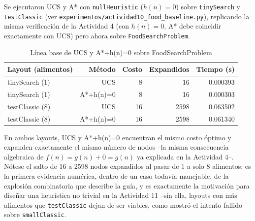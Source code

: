 Se ejecutaron UCS y A* con \texttt{nullHeuristic} ($h(n)=0$) sobre \texttt{tinySearch} y
\texttt{testClassic} (ver \texttt{experimentos/actividad10\_food\_baseline.py}), replicando la
misma verificación de la Actividad 4 (con $h(n)=0$, A* debe coincidir exactamente con UCS) pero
ahora sobre \texttt{FoodSearchProblem}.

\begin{table}[H]
\centering
\caption{Línea base de UCS y A*+h(n)=0 sobre FoodSearchProblem}
\label{tab:act10-baseline}
\begin{tabular}{lrrrr}
\toprule
\textbf{Layout (alimentos)} & \textbf{Método} & \textbf{Costo} & \textbf{Expandidos} & \textbf{Tiempo (s)} \\
\midrule
tinySearch (1)   & UCS       & 8  & 16   & 0.000393 \\
tinySearch (1)   & A*+h(n)=0 & 8  & 16   & 0.000303 \\
testClassic (8)  & UCS       & 16 & 2598 & 0.063502 \\
testClassic (8)  & A*+h(n)=0 & 16 & 2598 & 0.061340 \\
\bottomrule
\end{tabular}
\end{table}

En ambos layouts, UCS y A*+h(n)=0 encuentran el mismo costo óptimo y expanden exactamente el mismo
número de nodos --la misma consecuencia algebraica de $f(n) = g(n) + 0 = g(n)$ ya explicada en la
Actividad 4--. Nótese el salto de 16 a 2598 nodos expandidos al pasar de 1 a solo 8 alimentos: es
la primera evidencia numérica, dentro de un caso todavía manejable, de la explosión combinatoria que
describe la guía, y es exactamente la motivación para diseñar una heurística no trivial en la
Actividad 11 --sin ella, layouts con más alimentos que \texttt{testClassic} dejan de ser viables,
como mostró el intento fallido sobre \texttt{smallClassic}.
